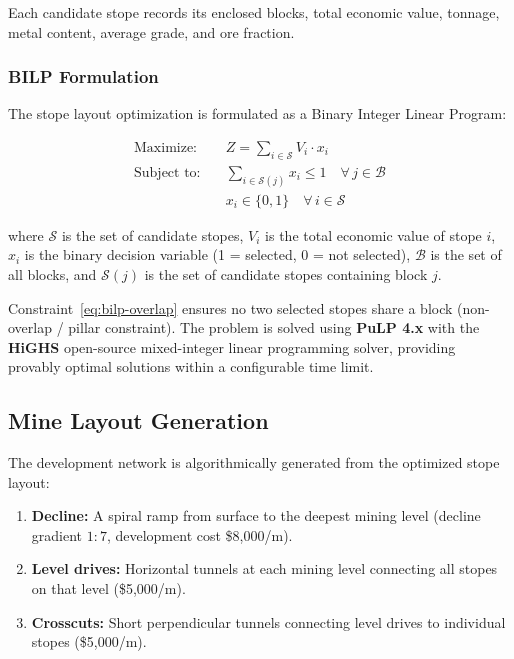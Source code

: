 \documentclass[12pt,a4paper]{article}
\begin{document}
Each candidate stope records its enclosed blocks, total economic value, tonnage, metal content, average grade, and ore fraction.

\subsubsection{BILP Formulation}

The stope layout optimization is formulated as a Binary Integer Linear Program:

\begin{align}
    \text{Maximize:} \quad & Z = \sum_{i \in \mathcal{S}} V_i \cdot x_i \label{eq:bilp-obj} \\
    \text{Subject to:} \quad & \sum_{i \in \mathcal{S}(j)} x_i \leq 1 \quad \forall\, j \in \mathcal{B} \label{eq:bilp-overlap} \\
    & x_i \in \{0, 1\} \quad \forall\, i \in \mathcal{S} \label{eq:bilp-binary}
\end{align}

where $\mathcal{S}$ is the set of candidate stopes, $V_i$ is the total economic value of stope $i$, $x_i$ is the binary decision variable (1 = selected, 0 = not selected), $\mathcal{B}$ is the set of all blocks, and $\mathcal{S}(j)$ is the set of candidate stopes containing block $j$.

Constraint~\eqref{eq:bilp-overlap} ensures no two selected stopes share a block (non-overlap / pillar constraint). The problem is solved using \textbf{PuLP 4.x} with the \textbf{HiGHS} open-source mixed-integer linear programming solver, providing provably optimal solutions within a configurable time limit.

\subsection{Mine Layout Generation}
\label{sec:mine-layout}

The development network is algorithmically generated from the optimized stope layout:

\begin{enumerate}
    \item \textbf{Decline:} A spiral ramp from surface to the deepest mining level (decline gradient $1:7$, development cost \$8{,}000/m).
    \item \textbf{Level drives:} Horizontal tunnels at each mining level connecting all stopes on that level (\$5{,}000/m).
    \item \textbf{Crosscuts:} Short perpendicular tunnels connecting level drives to individual stopes (\$5{,}000/m).
\end{enumerate}
\end{document}
